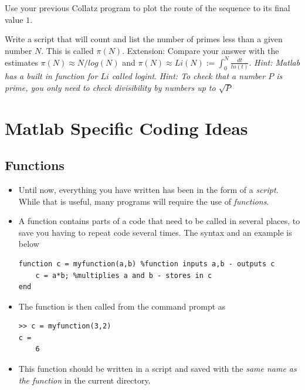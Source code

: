 \documentclass[12pt]{report}
\begin{document}
\begin{tcolorbox}[title=Task]
  Use your previous Collatz program to plot the route of the sequence to its final value $1$.
\end{tcolorbox}

\begin{tcolorbox}[title=Task - Difficult]
  Write a script that will count and list the number of primes less than a given number $N$. This is called $\pi(N)$.
  \tcblower
  Extension: Compare your answer with the estimates $\pi(N) \approx N/log(N)$ and $\pi(N) \approx Li(N) := \int_0^N \frac{dt}{ln(t)}$. \textit{Hint: Matlab has a built in function for $Li$ called logint}. \textit{Hint: To check that a number $P$ is prime, you only need to check divisibility by numbers up to $\sqrt{P}$}
\end{tcolorbox}

\clearpage

\section*{Matlab Specific Coding Ideas}

\subsection*{Functions}

\begin{itemize}
\item Until now, everything you have written has been in the form of a \textit{script}. While that is useful, many programs will require the use of \textit{functions}.
\item A function contains parts of a code that need to be called in several places, to save you having to repeat code several times. The syntax and an example is below
\begin{lstlisting}
function c = myfunction(a,b) %function inputs a,b - outputs c
	c = a*b; %multiplies a and b - stores in c
end
\end{lstlisting}
\item The function is then called from the command prompt as
\begin{lstlisting}
>> c = myfunction(3,2)
c = 
	6
\end{lstlisting}
\item This function should be written in a script and saved with the \textit{same name as the function} in the current directory.
\end{itemize}
\end{document}
